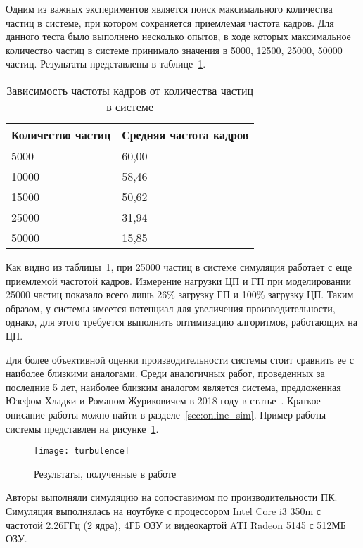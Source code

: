 Одним из важных экспериментов является поиск максимального количества частиц в
системе, при котором сохраняется приемлемая частота кадров. Для данного теста
было выполнено несколько опытов, в ходе которых максимальное количество частиц в
системе принимало значения в 5000, 12500, 25000, 50000 частиц. Результаты
представлены в таблице~\ref{table:amountBench}.
\begin{table}[htb]
\caption{Зависимость частоты кадров от количества частиц в системе}%
\label{table:amountBench}
\centering
\small
\begin{tabular}{| l | l |}
    \hline
    Количество частиц & Средняя частота кадров \\
    \hline
    5000 &  60,00 \\
    \hline
    10000 & 58,46 \\
    \hline
    15000 & 50,62 \\
    \hline
    25000 & 31,94 \\
    \hline
    50000 & 15,85 \\
    \hline
\end{tabular}
\end{table}

Как видно из таблицы~\ref{table:amountBench}, при 25000 частиц в системе
симуляция работает с еще приемлемой частотой кадров. Измерение нагрузки ЦП и ГП
при моделировании 25000 частиц показало всего лишь 26\% загрузку ГП и 100\%
загрузку ЦП. Таким образом, у системы имеется потенциал для увеличения
производительности, однако, для этого требуется выполнить оптимизацию
алгоритмов, работающих на ЦП.

Для более объективной оценки производительности системы стоит сравнить ее с
наиболее близкими аналогами. Среди аналогичных работ, проведенных за последние 5
лет, наиболее близким аналогом является система, предложенная Юзефом Хладки и
Романом Журиковичем в 2018 году в статье~\cite{turbulence}. Краткое описание
работы можно найти в разделе~\ref{sec:online_sim}. Пример работы системы
представлен на рисунке~\ref{fig:turbulence}.
\begin{figure}[htb]
	\centering
    \texttt{[image: turbulence]}
    \caption{Результаты, полученные в работе~\cite{turbulence}}%
    \label{fig:turbulence}
\end{figure}

Авторы выполняли симуляцию на сопоставимом по производительности ПК. Симуляция
выполнялась на ноутбуке с процессором Intel Core i3 350m с частотой 2.26ГГц (2
ядра), 4ГБ ОЗУ и видеокартой ATI Radeon 5145 с 512МБ ОЗУ.

